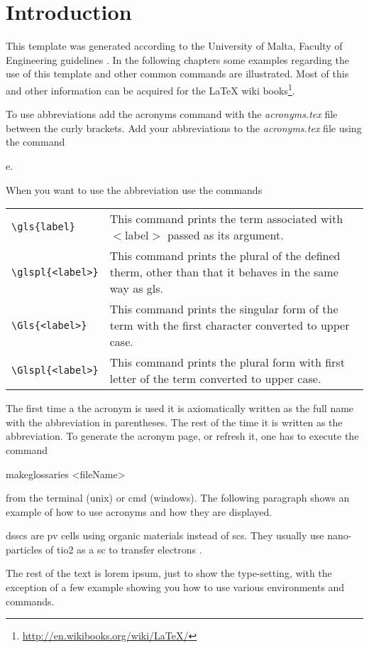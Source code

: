 \chapter{Introduction}
\label{ch:introduction}

This template was generated according to the University of Malta, Faculty of Engineering guidelines \cite{guidelines}. In the following chapters some examples regarding the use of this template and other common commands are illustrated. Most of this and other information can be acquired for the \LaTeX{} wiki books\footnote{\url{http://en.wikibooks.org/wiki/LaTeX/}}.

To use abbreviations add the acronyms command with the \textit{acronyms.tex} file between the curly brackets. Add your abbreviations to the \textit{acronyms.tex} file using the command
\begin{code}
e.\alpha
{}
\end{code}
When you want to use the abbreviation use the commands

\begin{table}[h!]
\center
\begin{tabular}{l p{11cm}}
\verb|\gls{label}| & This command prints the term associated with $<$label$>$ passed as its argument.\\
\verb|\glspl{<label>}| & This command prints the plural of the defined therm, other than that it behaves in the same way as gls.\\
\verb|\Gls{<label>}| & This command prints the singular form of the term with the first character converted to upper case.\\
\verb|\Glspl{<label>}| & This command prints the plural form with first letter of the term converted to upper case.\\
\end{tabular}
\end{table}

The first time a the acronym is used it is axiomatically written as the full name with the abbreviation in parentheses. The rest of the time it is written as the abbreviation. To generate the acronym page, or refresh it, one has to execute the command

\begin{code}
makeglossaries <fileName>
\end{code}

from the terminal (unix) or cmd (windows). The following paragraph shows an example of how to use acronyms and how they are displayed.

\glspl{dssc} are \gls{pv} cells using organic materials instead of \glspl{sc}. They usually use nano-particles of \gls{tio2} as a \gls{sc} to transfer electrons \cite{Gra91}.

The rest of the text is lorem ipsum, just to show the type-setting, with the exception of a few example showing you how to use various environments and commands.